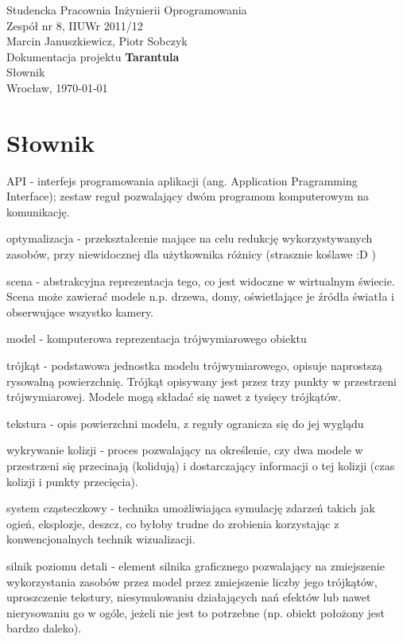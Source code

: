 \documentclass[11pt,leqno]{article}
\begin{document}
\begin{center}
\thispagestyle{empty}
{\Large Studencka Pracownia Inżynierii Oprogramowania}\\[0.5cm]
{\Large Zespół nr 8, IIUWr 2011/12}\\[2.5cm]

{Marcin Januszkiewicz, Piotr Sobczyk}\\[0.5cm]
{\huge Dokumentacja projektu \textbf{Tarantula}}\\[0.25cm]
{ Słownik}\\[0.5cm]
\vfill
{\large Wrocław, \today}
\end{center}

\newpage

\pagestyle{headings}

\section{Słownik}

API - interfejs programowania aplikacji (ang. Application Pragramming Interface); zestaw reguł pozwalający dwóm programom komputerowym na komunikację.

optymalizacja - przekształcenie mające na celu redukcję wykorzystywanych zasobów, przy niewidocznej dla użytkownika różnicy (strasznie koślawe :D )

scena - abstrakcyjna reprezentacja tego, co jest widoczne w wirtualnym świecie. Scena może zawierać modele n.p. drzewa, domy, oświetlające je źródła światła i obserwujące wszystko kamery.

model - komputerowa reprezentacja trójwymiarowego obiektu

trójkąt - podstawowa jednostka modelu trójwymiarowego, opisuje naprostszą rysowalną powierzchnię. Trójkąt opisywany jest przez trzy punkty w przestrzeni trójwymiarowej. Modele mogą składać się nawet z tysięcy trójkątów.

tekstura - opis powierzchni modelu, z reguły ogranicza się do jej wyglądu

wykrywanie kolizji - proces pozwalający na określenie, czy dwa modele w przestrzeni się przecinają (kolidują) i dostarczający informacji o tej kolizji (czas kolizji i punkty przecięcia).

system cząsteczkowy - technika umożliwiająca symulację zdarzeń takich jak ogień, eksplozje, deszcz, co byłoby trudne do zrobienia korzystając z konwencjonalnych technik wizualizacji.

silnik poziomu detali - element silnika graficznego pozwalający na zmiejszenie wykorzystania zasobów przez model przez zmiejszenie liczby jego trójkątów, uproszczenie tekstury, niesymulowaniu działających nań efektów lub nawet nierysowaniu go w ogóle, jeżeli nie jest to potrzebne (np. obiekt położony jest bardzo daleko).
\end{document}
